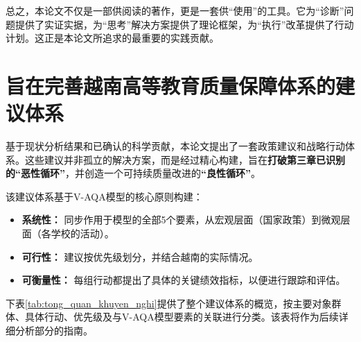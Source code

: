 总之，本论文不仅是一部供阅读的著作，更是一套供“使用”的工具。它为“诊断”问题提供了实证实据，为“思考”解决方案提供了理论框架，为“执行”改革提供了行动计划。这正是本论文所追求的最重要的实践贡献。



\section{旨在完善越南高等教育质量保障体系的建议体系}
\label{sec:he_thong_khuyen_nghi}

基于现状分析结果和已确认的科学贡献，本论文提出了一套政策建议和战略行动体系。这些建议并非孤立的解决方案，而是经过精心构建，旨在\textbf{打破第三章已识别的“恶性循环”}，并创造一个可持续质量改进的\textbf{“良性循环”}。

该建议体系基于V-AQA模型的核心原则构建：
\begin{itemize}
    \item \textbf{系统性：} 同步作用于模型的全部5个要素，从宏观层面（国家政策）到微观层面（各学校的活动）。
    \item \textbf{可行性：} 建议按优先级划分，并结合越南的实际情况。
    \item \textbf{可衡量性：} 每组行动都提出了具体的关键绩效指标，以便进行跟踪和评估。
\end{itemize}

下表\ref{tab:tong_quan_khuyen_nghi}提供了整个建议体系的概览，按主要对象群体、具体行动、优先级及与V-AQA模型要素的关联进行分类。该表将作为后续详细分析部分的指南。

